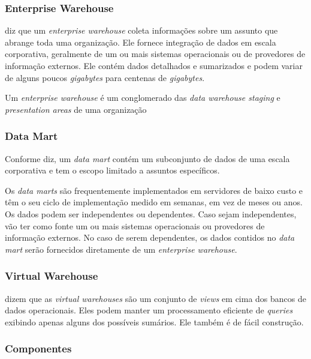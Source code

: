 \subsubsection{Enterprise Warehouse}
 diz que um \textit{enterprise warehouse} coleta informações sobre um assunto que abrange toda uma organização. Ele fornece integração de dados em escala corporativa, geralmente de um ou mais sistemas operacionais ou de provedores de informação externos. Ele contém dados detalhados e sumarizados e podem variar de alguns poucos \textit{gigabytes} para centenas de \textit{gigabytes}.

Um \textit{enterprise warehouse} é um conglomerado das \textit{data warehouse staging} e \textit{presentation areas} de uma organização \citep{kimball2002}


\subsubsection{Data Mart}
Conforme  diz, um \textit{data mart} contém um subconjunto de dados de uma escala corporativa e tem o escopo limitado a assuntos específicos.

Os \textit{data marts} são frequentemente implementados em servidores de baixo custo e têm o seu ciclo de implementação medido em semanas, em vez de meses ou anos. Os dados podem ser independentes ou dependentes. Caso sejam independentes, vão ter como fonte um ou mais sistemas operacionais ou provedores de informação externos. No caso de serem dependentes, os dados contidos no \textit{data mart} serão fornecidos diretamente de um \textit{enterprise warehouse}.

\subsubsection{Virtual Warehouse}
 dizem que as \textit{virtual warehouses} são um conjunto de \textit{views} em cima dos bancos de dados operacionais. Eles podem manter um processamento eficiente de \textit{queries} exibindo apenas alguns dos possíveis sumários. Ele também é de fácil construção.

\subsubsection{Componentes}

